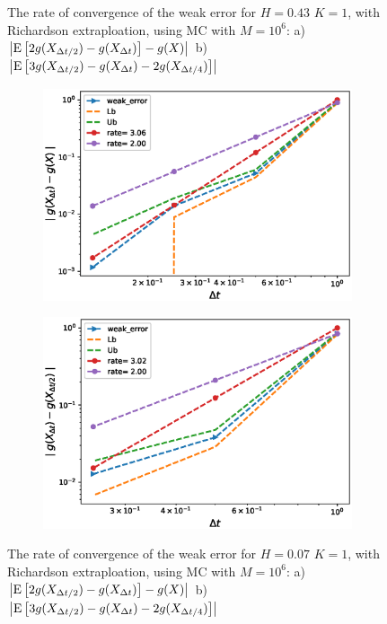 \documentclass[11pt]{article}
\newcommand{\expt}[1]{\mathrm{E}\left[#1\right]}
\begin{document}
\begin{figure}[h!]
	\caption{The rate of convergence of the weak error for $H=0.43$ $K=1$, with Richardson extraploation, using MC with $M=10^6$: a) $\abs{\expt{2 g(X_{\Delta t/2}) -g(X_{\Delta t})}-g(X)}$  b) $\abs{\expt{3 g(X_{\Delta t/2})-g(X_{\Delta t})-2 g(X_{\Delta t/4})}}$ }
	\label{fig:Weak_rate_H_043_with_rich}
\end{figure}

\begin{figure}[h!]
	\centering
	\begin{subfigure}{.4\textwidth}
		\centering
		\includegraphics[width=1\linewidth]{./figures/rBergomi_weak_error_rates/with_richardson/H_007/weak_convergence_order_Bergomi_H_007_K_1_M_10_6_CI_richardson_relative.eps}
		\caption{}
		\label{fig:sub3}
	\end{subfigure}%
	\begin{subfigure}{.4\textwidth}
		\centering
		\includegraphics[width=1\linewidth]{./figures/rBergomi_weak_error_rates/with_richardson/H_007/weak_convergence_order_differences_Bergomi_H_007_K_1_M_10_6_CI_richardson_relative}
		\caption{}
		\label{fig:sub4}
	\end{subfigure}
	
	\caption{The rate of convergence of the weak error for $H=0.07$ $K=1$, with Richardson extraploation, using MC with $M=10^6$: a) $\abs{\expt{2 g(X_{\Delta t/2}) -g(X_{\Delta t})}-g(X)}$  b) $\abs{\expt{3 g(X_{\Delta t/2})-g(X_{\Delta t})-2 g(X_{\Delta t/4})}}$ }
	\label{fig:Weak_rate_H_007_with_rich}
\end{figure}
\end{document}
